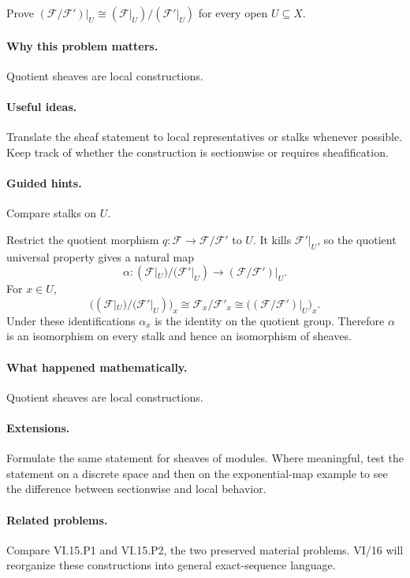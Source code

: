 \begin{problem}\label{prob:vi15-p12}
Prove $(\mathcal F/\mathcal F')|_U\cong(\mathcal F|_U)/(\mathcal F'|_U)$ for every open $U\subseteq X$.
\end{problem}

\ifdefined\FullProblemDossiers
\paragraph{Why this problem matters.}
Quotient sheaves are local constructions.

\paragraph{Useful ideas.}
Translate the sheaf statement to local representatives or stalks whenever possible.  Keep track of whether the construction is sectionwise or requires sheafification.

\paragraph{Guided hints.}
Compare stalks on $U$.

\begin{solution}
Restrict the quotient morphism $q:\mathcal F\to\mathcal F/\mathcal F'$ to $U$. It kills $\mathcal F'|_U$, so the quotient universal property gives a natural map
\[
\alpha:(\mathcal F|_U)/(\mathcal F'|_U)\longrightarrow(\mathcal F/\mathcal F')|_U.
\]
For $x\in U$,
\[
\bigl((\mathcal F|_U)/(\mathcal F'|_U)\bigr)_x
\cong\mathcal F_x/\mathcal F'_x
\cong
\bigl((\mathcal F/\mathcal F')|_U\bigr)_x.
\]
Under these identifications $\alpha_x$ is the identity on the quotient group. Therefore $\alpha$ is an isomorphism on every stalk and hence an isomorphism of sheaves.
\end{solution}

\paragraph{What happened mathematically.}
Quotient sheaves are local constructions.

\paragraph{Extensions.}
Formulate the same statement for sheaves of modules.  Where meaningful, test the statement on a discrete space and then on the exponential-map example to see the difference between sectionwise and local behavior.

\paragraph{Related problems.}
Compare VI.15.P1 and VI.15.P2, the two preserved material problems.  VI/16 will reorganize these constructions into general exact-sequence language.
\fi

